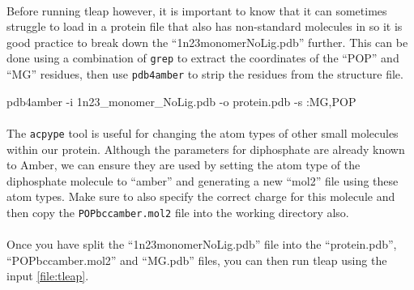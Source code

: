     \paragraph{}
        Before running tleap however, it is important to know that it can sometimes struggle to load in a protein file that also has non-standard molecules in so it is good practice to break down the \enquote{1n23\textunderscore monomer\textunderscore NoLig.pdb} further. This can be done using a combination of \texttt{grep} to extract the coordinates of the \enquote{POP} and \enquote{MG} residues, then use \texttt{pdb4amber} to strip the residues from the structure file.

    \begin{bashcmd}[label=cmd:pdbamber]{}
    pdb4amber -i 1n23_monomer_NoLig.pdb -o protein.pdb -s :MG,POP
    \end{bashcmd}
      
    \paragraph{}
        The \texttt{acpype} tool is useful for changing the atom types of other small molecules within our protein. Although the parameters for diphosphate are already known to Amber, we can ensure they are used by setting the atom type of the diphosphate molecule to \enquote{amber} and generating a new \enquote{mol2} file using these atom types. Make sure to also specify the correct charge for this molecule and then copy the \texttt{POP\textunderscore bcc\textunderscore amber.mol2} file into the working directory also.

    \paragraph{}
        Once you have split the \enquote{1n23\textunderscore monomer\textunderscore NoLig.pdb} file into the \enquote{protein.pdb}, \enquote{POP\textunderscore bcc\textunderscore amber.mol2} and \enquote{MG.pdb} files, you can then run tleap using the input \cref{file:tleap}.

